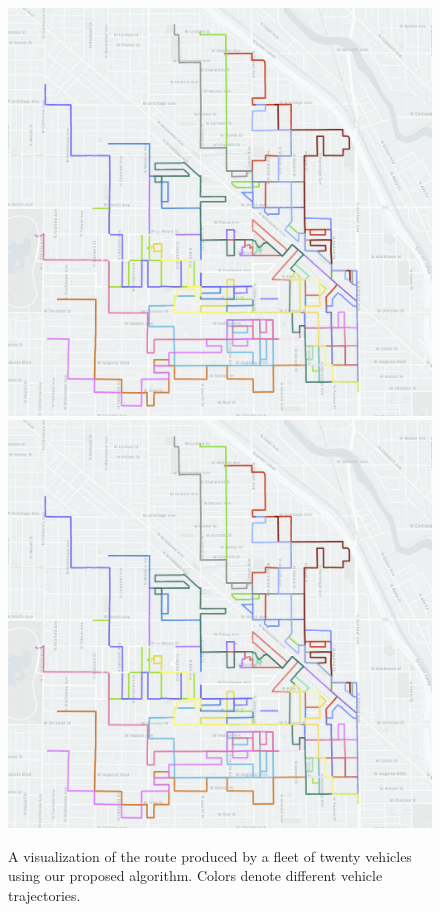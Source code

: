 \begin{figure}[t]
\begin{center}
\iflatexml
\includegraphics[width=6\textwidth,trim={3cm 0 6cm 10cm},clip]{figs/teaser.png}
\else
\includegraphics[width=0.94\columnwidth,trim={3cm 0 6cm 10cm},clip]{figs/teaser.png}
\fi
\vspace{-0.15in}
\caption{A visualization of the route produced by a fleet of twenty vehicles using our proposed
algorithm. Colors denote different vehicle trajectories.}
\label{fig:teaser}
\end{center}
\vspace{-0.25in}
\end{figure}